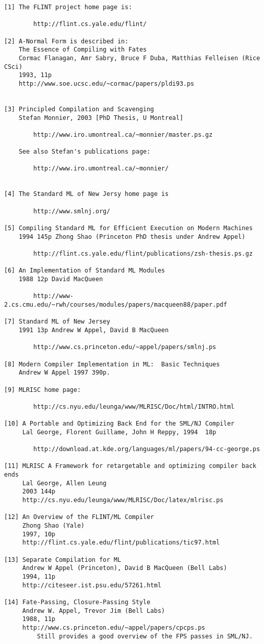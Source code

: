 \begin{verbatim}
[1] The FLINT project home page is:

        http://flint.cs.yale.edu/flint/

[2] A-Normal Form is described in:
    The Essence of Compiling with Fates
    Cormac Flanagan, Amr Sabry, Bruce F Duba, Matthias Felleisen (Rice CSci)
    1993, 11p
    http://www.soe.ucsc.edu/~cormac/papers/pldi93.ps


[3] Principled Compilation and Scavenging
    Stefan Monnier, 2003 [PhD Thesis, U Montreal]

        http://www.iro.umontreal.ca/~monnier/master.ps.gz 

    See also Stefan's publications page:

        http://www.iro.umontreal.ca/~monnier/


[4] The Standard ML of New Jersy home page is

        http://www.smlnj.org/

[5] Compiling Standard ML for Efficient Execution on Modern Machines
    1994 145p Zhong Shao (Princeton PhD thesis under Andrew Appel)

        http://flint.cs.yale.edu/flint/publications/zsh-thesis.ps.gz

[6] An Implementation of Standard ML Modules
    1988 12p David MacQueen

        http://www-2.cs.cmu.edu/~rwh/courses/modules/papers/macqueen88/paper.pdf

[7] Standard ML of New Jersey
    1991 13p Andrew W Appel, David B MacQueen

        http://www.cs.princeton.edu/~appel/papers/smlnj.ps

[8] Modern Compiler Implementation in ML:  Basic Techniques
    Andrew W Appel 1997 390p.

[9] MLRISC home page:

        http://cs.nyu.edu/leunga/www/MLRISC/Doc/html/INTRO.html

[10] A Portable and Optimizing Back End for the SML/NJ Compiler
     Lal George, Florent Guillame, John H Reppy, 1994  18p

        http://download.at.kde.org/languages/ml/papers/94-cc-george.ps

[11] MLRISC A Framework for retargetable and optimizing compiler back ends
     Lal George, Allen Leung
     2003 144p
     http://cs.nyu.edu/leunga/www/MLRISC/Doc/latex/mlrisc.ps

[12] An Overview of the FLINT/ML Compiler
     Zhong Shao (Yale)
     1997, 10p
     http://flint.cs.yale.edu/flint/publications/tic97.html

[13] Separate Compilation for ML
     Andrew W Appel (Princeton), David B MacQueen (Bell Labs)
     1994, 11p
     http://citeseer.ist.psu.edu/57261.html

[14] Fate-Passing, Closure-Passing Style
     Andrew W. Appel, Trevor Jim (Bell Labs)
     1988, 11p
     http://www.cs.princeton.edu/~appel/papers/cpcps.ps
         Still provides a good overview of the FPS passes in SML/NJ.
\end{verbatim}


\cutend*
